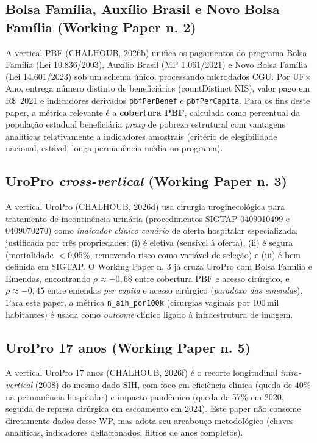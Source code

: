 \documentclass[12pt,a4paper,oneside]{article}
\newcommand{\rs}{R\$\,}
\begin{document}
\subsection{Bolsa Família, Auxílio Brasil e Novo Bolsa Família
(Working Paper n. 2)}

A vertical PBF (CHALHOUB, 2026b) unifica os pagamentos do programa
Bolsa Família (Lei 10.836/2003), Auxílio Brasil (MP 1.061/2021) e
Novo Bolsa Família (Lei 14.601/2023) sob um schema único, processando
microdados CGU. Por UF$\times$Ano, entrega número distinto de
beneficiários (countDistinct NIS), valor pago em \rs{} 2021 e
indicadores derivados \texttt{pbfPerBenef} e \texttt{pbfPerCapita}.
Para os fins deste paper, a métrica relevante é a
\textbf{cobertura PBF}, calculada como percentual da população
estadual beneficiária \textemdash{} \textit{proxy} de pobreza
estrutural com vantagens analíticas relativamente a indicadores
amostrais (critério de elegibilidade nacional, estável, longa
permanência média no programa).

\subsection{UroPro \textit{cross-vertical} (Working Paper n. 3)}

A vertical UroPro (CHALHOUB, 2026d) usa cirurgia uroginecológica
para tratamento de incontinência urinária (procedimentos SIGTAP
0409010499 e 0409070270) como \textit{indicador clínico canário}
de oferta hospitalar especializada, justificada por três
propriedades: (i) é eletiva (sensível à oferta), (ii) é segura
(mortalidade $<$0,05\%, removendo risco como variável de seleção)
e (iii) é bem definida em SIGTAP. O Working Paper n. 3 já cruza
UroPro com Bolsa Família e Emendas, encontrando $\rho \approx
-0{,}68$ entre cobertura PBF e acesso cirúrgico, e $\rho \approx
-0{,}45$ entre emendas \textit{per capita} e acesso cirúrgico
(\textit{paradoxo das emendas}). Para este paper, a métrica
\texttt{n\_aih\_por100k} (cirurgias vaginais por 100\,mil habitantes)
é usada como \textit{outcome} clínico ligado à infraestrutura de
imagem.

\subsection{UroPro 17 anos (Working Paper n. 5)}

A vertical UroPro 17 anos (CHALHOUB, 2026f) é o recorte longitudinal
\textit{intra-vertical} (2008) do mesmo dado SIH,
com foco em eficiência clínica (queda de 40\% na permanência
hospitalar) e impacto pandêmico (queda de 57\% em 2020,
seguida de represa cirúrgica em escoamento em 2024).
Este paper não consome diretamente dados desse WP, mas adota seu
arcabouço metodológico (chaves analíticas, indicadores deflacionados,
filtros de anos completos).
\end{document}
